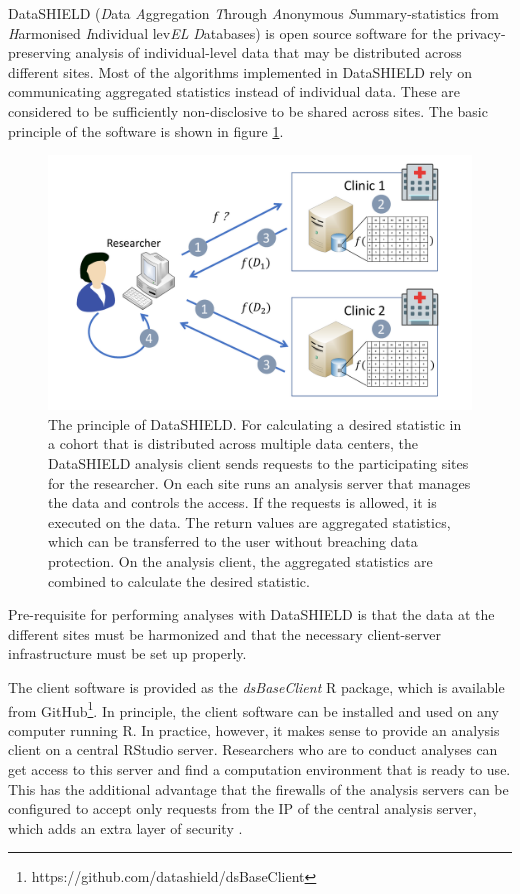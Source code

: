 \documentclass[12pt]{article}
\newcommand{\apkg}[1]{\emph{#1}}
\newcommand{\circlenum}[1]{\raisebox{.5pt}{\textcircled{\raisebox{-.9pt} {#1}}}}
\begin{document}
DataSHIELD ({\em D}ata {\em A}ggregation {\em T}hrough
{\em A}nonymous {\em S}ummary-statistics from {\em H}armonised {\em I}ndividual
lev{\em EL} {\em D}atabases) \citep{budin-ljosne_datashield} is open source software for the privacy-preserving analysis of individual-level data that may be distributed across different sites.
Most of the algorithms implemented in DataSHIELD rely on communicating aggregated statistics instead of individual data.
These are considered to be sufficiently non-disclosive to be shared across sites.
The basic principle of the software is shown in figure \ref{fig:datashieldprinciple}.

 \begin{figure}[h]
   \centering
   \includegraphics[scale=0.6]{images/datashieldprinciple.pdf}
   \caption{The principle of DataSHIELD. For calculating a desired statistic in a cohort that is distributed across multiple data centers, the DataSHIELD analysis client sends requests \circlenum{1} to the participating sites for the researcher. \circlenum{2} On each site runs an analysis server that manages the data and controls the access. If the requests is allowed, it is executed on the data. \circlenum{3} The return values are aggregated statistics, which can be transferred to the user without breaching data protection. \circlenum{4} On the analysis client, the aggregated statistics are combined to calculate the desired statistic.}
   \label{fig:datashieldprinciple}
 \end{figure}

Pre-requisite for performing analyses with DataSHIELD is that the data at the different sites must be harmonized and that the necessary client-server infrastructure must be set up properly.

The client software is provided as the \apkg{dsBaseClient} R package, which is available from GitHub\footnote{https://github.com/datashield/dsBaseClient}.
In principle, the client software can be installed and used on any computer running R.
In practice, however, it makes sense to provide an analysis client on a central RStudio server.
Researchers who are to conduct analyses can get access to this server and find a computation environment that is ready to use.
This has the additional advantage that the firewalls of the analysis servers can be configured to accept only requests from the IP of the central analysis server, which adds an extra layer of security \citep{gruendner}.
\end{document}
